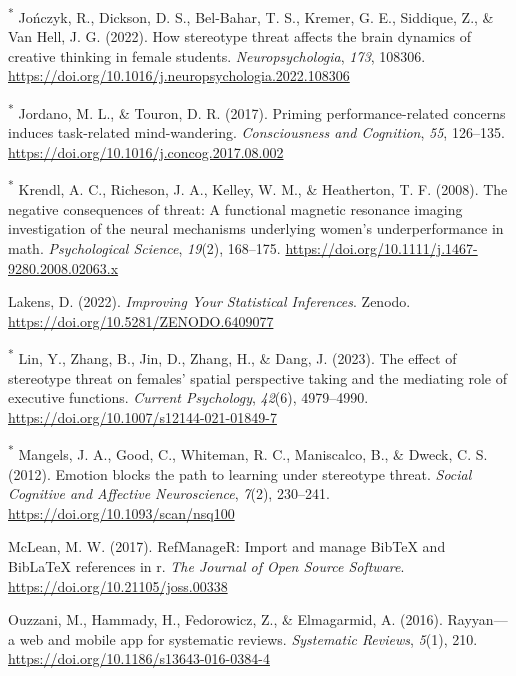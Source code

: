 \documentclass[
  stu,floatsintext]{apa7}
\newlength{\cslhangindent}
\newenvironment{CSLReferences}[2] %
 {\begin{list}{}{%
  \setlength{\itemindent}{0pt}
  \setlength{\leftmargin}{0pt}
  \setlength{\parsep}{0pt}
  \ifodd #1
   \setlength{\leftmargin}{\cslhangindent}
   \setlength{\itemindent}{-1\cslhangindent}
  \fi
  \setlength{\itemsep}{#2\baselineskip}}}
 {\end{list}}
\begin{document}
\begin{CSLReferences}{1}{0}
\textsuperscript{*} Jończyk, R., Dickson, D. S., Bel-Bahar, T. S., Kremer, G. E., Siddique, Z., \& Van Hell, J. G. (2022). How stereotype threat affects the brain dynamics of creative thinking in female students. \emph{Neuropsychologia}, \emph{173}, 108306. \url{https://doi.org/10.1016/j.neuropsychologia.2022.108306}

\textsuperscript{*} Jordano, M. L., \& Touron, D. R. (2017). Priming performance-related concerns induces task-related mind-wandering. \emph{Consciousness and Cognition}, \emph{55}, 126--135. \url{https://doi.org/10.1016/j.concog.2017.08.002}

\textsuperscript{*} Krendl, A. C., Richeson, J. A., Kelley, W. M., \& Heatherton, T. F. (2008). The negative consequences of threat: A functional magnetic resonance imaging investigation of the neural mechanisms underlying women's underperformance in math. \emph{Psychological Science}, \emph{19}(2), 168--175. \url{https://doi.org/10.1111/j.1467-9280.2008.02063.x}

Lakens, D. (2022). \emph{Improving {Your Statistical Inferences}}. Zenodo. \url{https://doi.org/10.5281/ZENODO.6409077}

\textsuperscript{*} Lin, Y., Zhang, B., Jin, D., Zhang, H., \& Dang, J. (2023). The effect of stereotype threat on females' spatial perspective taking and the mediating role of executive functions. \emph{Current Psychology}, \emph{42}(6), 4979--4990. \url{https://doi.org/10.1007/s12144-021-01849-7}

\textsuperscript{*} Mangels, J. A., Good, C., Whiteman, R. C., Maniscalco, B., \& Dweck, C. S. (2012). Emotion blocks the path to learning under stereotype threat. \emph{Social Cognitive and Affective Neuroscience}, \emph{7}(2), 230--241. \url{https://doi.org/10.1093/scan/nsq100}

McLean, M. W. (2017). RefManageR: Import and manage BibTeX and BibLaTeX references in r. \emph{The Journal of Open Source Software}. \url{https://doi.org/10.21105/joss.00338}

Ouzzani, M., Hammady, H., Fedorowicz, Z., \& Elmagarmid, A. (2016). Rayyan---a web and mobile app for systematic reviews. \emph{Systematic Reviews}, \emph{5}(1), 210. \url{https://doi.org/10.1186/s13643-016-0384-4}


\end{CSLReferences}
\end{document}
